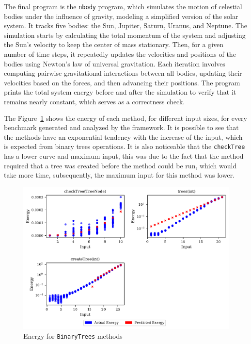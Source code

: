The final program is the \texttt{nbody} program, which simulates the motion of celestial bodies under the influence of gravity, modeling a simplified version of the solar system. It tracks five bodies: the Sun, Jupiter, Saturn, Uranus, and Neptune. The simulation starts by calculating the total momentum of the system and adjusting the Sun’s velocity to keep the center of mass stationary. Then, for a given number of time steps, it repeatedly updates the velocities and positions of the bodies using Newton’s law of universal gravitation. Each iteration involves computing pairwise gravitational interactions between all bodies, updating their velocities based on the forces, and then advancing their positions. The program prints the total system energy before and after the simulation to verify that it remains nearly constant, which serves as a correctness check. 



The Figure~\ref{fig:binarytrees_energy_panel_plot} shows the energy of each method, for different input sizes, for every benchmark generated and analyzed by the framework. It is possible to see that the methods have an exponential tendency with the increase of the input, which is expected from binary trees operations. It is also noticeable that the \texttt{checkTree} has a lower curve and maximum input, this was due to the fact that the method required that a tree was created before the method could be run, which would take more time, subsequently, the maximum input for this method was lower. 

\begin{figure}[htbp]
  \centering
  \includegraphics[width=\textwidth]{figures/binarytrees_energy_panel_plot.pdf}
  \caption{Energy for \texttt{BinaryTrees} methods}
  \label{fig:binarytrees_energy_panel_plot}
\end{figure}

